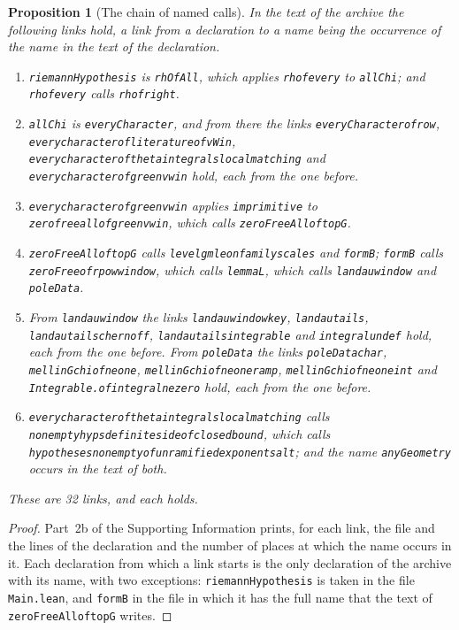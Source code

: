 \documentclass[11pt]{article}
\newtheorem{proposition}[theorem]{Proposition}
\theoremstyle{definition}
\theoremstyle{remark}
\DeclareRobustCommand{\lean}[1]{{\renewcommand{\_}{\textunderscore\allowbreak}\texttt{#1}}}
\begin{document}
\begin{proposition}[The chain of named calls]\label{prop:chain}
In the text of the archive the following links hold, a \emph{link} from a declaration to a name being the occurrence of the name in the text of the declaration.
\begin{enumerate}[leftmargin=2em,itemsep=1pt]\sloppy
\item \lean{riemannHypothesis} is \lean{rhOfAll}, which applies \lean{rh\_of\_every} to \lean{allChi}; and \lean{rh\_of\_every} calls \lean{rh\_of\_right}.
\item \lean{allChi} is \lean{everyCharacter}, and from there the links \lean{everyCharacter\_of\_row}, \lean{every\_character\_of\_literature\_of\_vWin}, \lean{every\_character\_of\_theta\_integrals\_local\_matching} and \lean{every\_character\_of\_green\_v\_win} hold, each from the one before.
\item \lean{every\_character\_of\_green\_v\_win} applies \lean{imprimitive} to \lean{zero\_free\_all\_of\_green\_v\_win}, which calls \lean{zeroFreeAll\_of\_topG}.
\item \lean{zeroFreeAll\_of\_topG} calls \lean{level\_gm\_le\_on\_family\_scales} and \lean{formB}; \lean{formB} calls \lean{zeroFree\_of\_rpow\_window}, which calls \lean{lemmaL}, which calls \lean{landau\_window} and \lean{poleData}.
\item From \lean{landau\_window} the links \lean{landau\_window\_key}, \lean{landau\_tails}, \lean{landau\_tails\_chernoff}, \lean{landau\_tails\_integrable} and \lean{integral\_undef} hold, each from the one before. From \lean{poleData} the links \lean{poleData\_char}, \lean{mellin\_Gchi\_of\_ne\_one}, \lean{mellin\_Gchi\_of\_ne\_one\_ramp}, \lean{mellin\_Gchi\_of\_ne\_one\_int} and \lean{Integrable.of\_integral\_ne\_zero} hold, each from the one before.
\item \lean{every\_character\_of\_theta\_integrals\_local\_matching} calls \lean{nonempty\_hyps\_definite\_side\_of\_closed\_bound}, which calls \lean{hypotheses\_nonempty\_of\_unramified\_exponents\_alt}; and the name \lean{anyGeometry} occurs in the text of both.
\end{enumerate}
These are 32 links, and each holds.
\end{proposition}

\begin{proof}
Part~2b of the Supporting Information prints, for each link, the file and the lines of the declaration and the number of places at which the name occurs in it. Each declaration from which a link starts is the only declaration of the archive with its name, with two exceptions: \lean{riemannHypothesis} is taken in the file \lean{Main.lean}, and \lean{formB} in the file in which it has the full name that the text of \lean{zeroFreeAll\_of\_topG} writes.
\end{proof}
\end{document}
